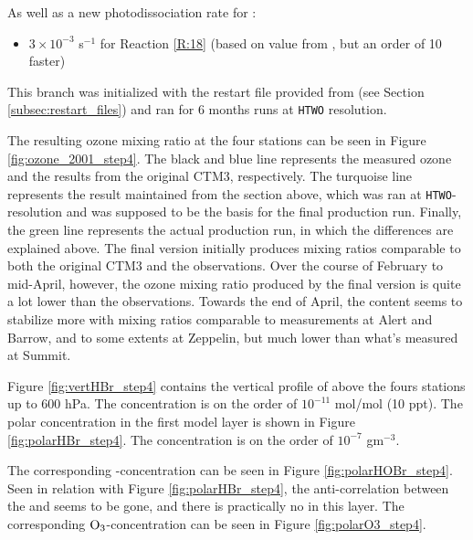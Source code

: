 As well as a new photodissociation rate for :

\begin{itemize}
    \item $3\times10^{-3}$ s$^{-1}$ for Reaction \ref{R:18} (based on value from \cite{CAO}, but an order of 10 faster)
\end{itemize}

This branch was initialized with the restart file provided from \cite{StefaniePersonal} (see Section \ref{subsec:restart_files}) and ran for 6 months runs at \texttt{HTWO} resolution. 

\medskip

The resulting ozone mixing ratio at the four stations can be seen in Figure \ref{fig:ozone_2001_step4}. The black and blue line represents the measured ozone and the results from the original CTM3, respectively. The turquoise line represents the result maintained from the section above, which was ran at \texttt{HTWO}-resolution and was supposed to be the basis for the final production run. Finally, the green line represents the actual production run, in which the differences are explained above. The final version initially produces mixing ratios comparable to both the original CTM3 and the observations. Over the course of February to mid-April, however, the ozone mixing ratio produced by the final version is quite a lot lower than the observations. Towards the end of April, the content seems to stabilize more with mixing ratios comparable to measurements at Alert and Barrow, and to some extents at Zeppelin, but much lower than what's measured at Summit. 



\medskip

Figure \ref{fig:vertHBr_step4} contains the vertical profile of  above the fours stations up to 600 hPa. The concentration is on the order of $10^{-11}$ mol/mol (10 ppt). The polar concentration in the first model layer is shown in Figure \ref{fig:polarHBr_step4}. The concentration is on the order of $10^{-7}$ gm$^{-3}$. 

\medskip






\medskip

The corresponding -concentration can be seen in Figure \ref{fig:polarHOBr_step4}. Seen in relation with Figure \ref{fig:polarHBr_step4}, the anti-correlation between the  and  seems to be gone, and there is practically no  in this layer. The corresponding $\mathrm{O_3}$-concentration can be seen in Figure \ref{fig:polarO3_step4}.

